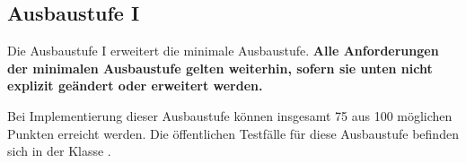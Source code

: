 \subsection{Ausbaustufe I}
\label{sec:ausbau1}

Die Ausbaustufe I erweitert die minimale Ausbaustufe. \textbf{Alle
  Anforderungen der minimalen Ausbaustufe gelten weiterhin, sofern sie
  unten nicht explizit ge\"andert oder erweitert werden.}

Bei Implementierung dieser Ausbaustufe k\"onnen insgesamt 75 aus 100
m\"oglichen Punkten erreicht werden. Die \"offentlichen Testf\"alle
f\"ur diese Ausbaustufe befinden sich in der Klasse \texttt{\testLvA}.
